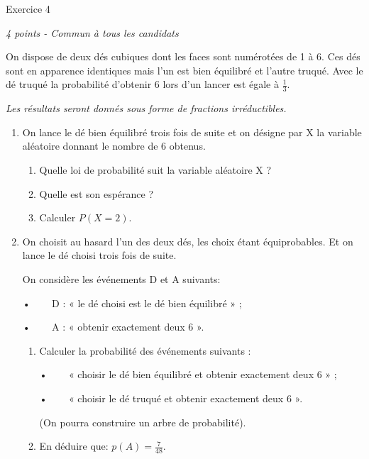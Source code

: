 
%
\begin{h2}Exercice 4\end{h2}
\textit{4 points - Commun à tous les candidats}
\par
On dispose de deux dés cubiques dont les faces sont numérotées de 1 à 6. Ces dés sont en apparence identiques mais l'un est bien équilibré et l'autre truqué. Avec le dé truqué la probabilité d'obtenir 6 lors d'un lancer est égale à $\frac{1}{3}$.
\par
\textit{Les résultats seront donnés sous forme de fractions irréductibles.}
\begin{enumerate}
     \item
     On lance le dé bien équilibré trois fois de suite et on désigne par X la variable aléatoire donnant le nombre de 6 obtenus.
     \begin{enumerate}[label=\alph*.]
          \item
          Quelle loi de probabilité suit la variable aléatoire X ?
          \item
          Quelle est son espérance ?
          \item
          Calculer $P\left(X=2\right)$.
     \end{enumerate}
     \item
     On choisit au hasard l'un des deux dés, les choix étant équiprobables. Et on lance le dé choisi trois fois de suite.
     \par
     On considère les événements D et A suivants:
     \par
     •ﾠﾠ D : « le dé choisi est le dé bien équilibré » ;
     \par
     •ﾠﾠ A : « obtenir exactement deux 6 ».
     \begin{enumerate}[label=\alph*.]
          \item
          Calculer la probabilité des événements suivants :
          \par
          •ﾠﾠ « choisir le dé bien équilibré et obtenir exactement deux 6 » ;
          \par
          •ﾠﾠ « choisir le dé truqué et obtenir exactement deux 6 ».
          \par
          (On pourra construire un arbre de probabilité).
          \item
          En déduire que: $p\left(A\right)=\frac{7}{48}$.

\end{enumerate}
\end{enumerate}
